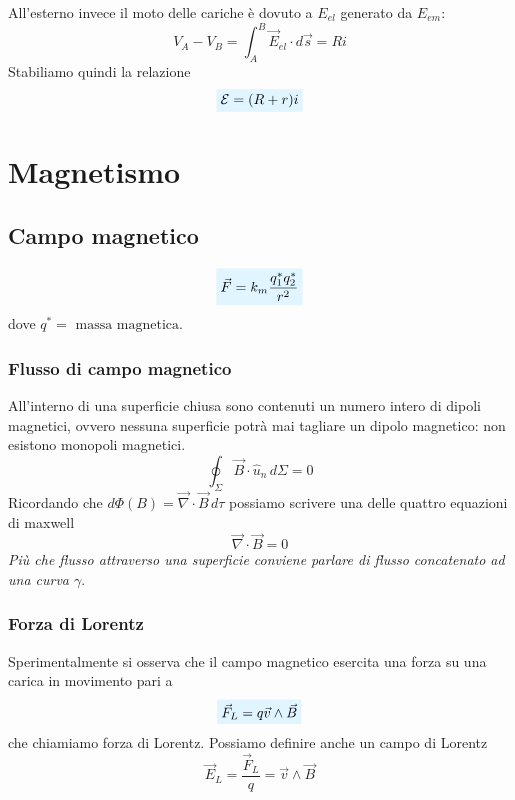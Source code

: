 \documentclass[x11names]{report}
\begin{document}
All'esterno invece il moto delle cariche è dovuto a \(E_{el}\) generato da \(E_{em}\):
\[
V_A-V_B = \int_{A}^B\vec{E}_{el}\cdot d\vec{s} = Ri
\]
Stabiliamo quindi la relazione
\begin{equation}
	\viola{\mathcal{E} = (R+r)i}
\end{equation}

\chapter{Magnetismo}


\section{Campo magnetico}


\begin{equation}
	\viola{\vec{F} = k_m\frac{q_{1}^{*}q_{2}^{*}}{r^2}}
\end{equation}
dove \(q^{*} = \text{ massa magnetica}\).

\subsection{Flusso di campo magnetico}
All'interno di una superficie chiusa sono contenuti un numero intero di dipoli magnetici, ovvero nessuna superficie potrà mai tagliare un dipolo magnetico: non esistono monopoli magnetici.
\[
\oint_\Sigma \vec{B}\cdot \hat{u}_n \, d\Sigma = 0
\]
Ricordando che \(d\Phi(B) = \vec{\nabla} \cdot \vec{B} \, d\tau\) possiamo scrivere una delle quattro equazioni di maxwell
\begin{equation}
	\vec{\nabla} \cdot \vec{B}  = 0
\end{equation}
\textit{Più che flusso attraverso una superficie conviene parlare di flusso concatenato ad una curva \(\gamma\)}.
\subsection{Forza di Lorentz}
Sperimentalmente si osserva che il campo magnetico esercita una forza su una carica in movimento pari a
\begin{equation}
	\viola{\vec{F}_L = q\vec{v} \wedge \vec{B}}
\end{equation}
che chiamiamo forza di Lorentz. Possiamo definire anche un campo di Lorentz
\[
\vec{E}_L = \frac{\vec{F}_L}{q} = \vec{v} \wedge \vec{B}
\]
\begin{figure}[H]
	\centering
\end{figure}
\end{document}
